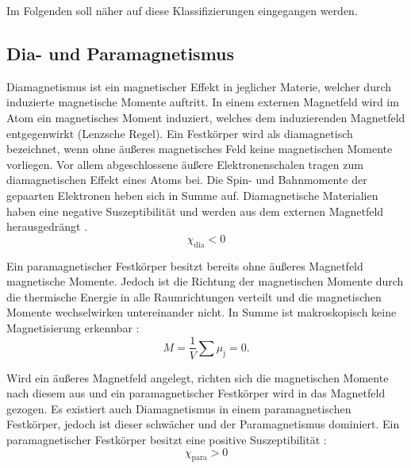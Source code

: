 \documentclass[page,pdftex,12pt,a4paper,twoside,openright]{scrbook}
\begin{document}
Im Folgenden soll näher auf diese Klassifizierungen eingegangen werden.\\

\subsection{Dia- und Paramagnetismus \label{sec-dia-und-para}}
\label{sec:org6b55039}
Diamagnetismus ist ein magnetischer Effekt in jeglicher Materie, welcher durch induzierte magnetische Momente auftritt. In einem externen Magnetfeld wird im Atom ein magnetisches Moment induziert, welches dem induzierenden Magnetfeld entgegenwirkt (Lenzsche Regel). Ein Festkörper wird als diamagnetisch bezeichnet, wenn ohne äußeres magnetisches Feld keine magnetischen Momente vorliegen. Vor allem abgeschlossene äußere Elektronenschalen tragen zum diamagnetischen Effekt eines Atoms bei. Die Spin- und Bahnmomente der gepaarten Elektronen heben sich in Summe auf. Diamagnetische Materialien haben eine negative Suszeptibilität und werden aus dem externen Magnetfeld herausgedrängt \cite{gross_festkorperphysik_2012}.\\

\begin{equation}
\label{eq-dia}
\chi_\mathrm{dia} < 0
\end{equation}

Ein paramagnetischer Festkörper besitzt bereits ohne äußeres Magnetfeld magnetische Momente. Jedoch ist die Richtung der magnetischen Momente durch die thermische Energie in alle Raumrichtungen verteilt und die magnetischen Momente wechselwirken untereinander nicht. In Summe ist makroskopisch keine Magnetisierung erkennbar \cite{demtroder_experimentalphysik_2017}:\\

\begin{equation}
\label{eq-m-para}
M = \frac{1}{V} \sum \mu_\mathrm{j} = 0.
\end{equation}

Wird ein äußeres Magnetfeld angelegt, richten sich die magnetischen Momente nach diesem aus und ein paramagnetischer Festkörper wird in das Magnetfeld gezogen. Es existiert auch Diamagnetismus in einem paramagnetischen Festkörper, jedoch ist dieser schwächer und der Paramagnetismus dominiert. Ein paramagnetischer Festkörper besitzt eine positive Suszeptibilität \cite{gross_festkorperphysik_2012}:\\

\begin{equation}
\label{eq-susz-para}
\chi_\mathrm{para} > 0
\end{equation}
\end{document}
